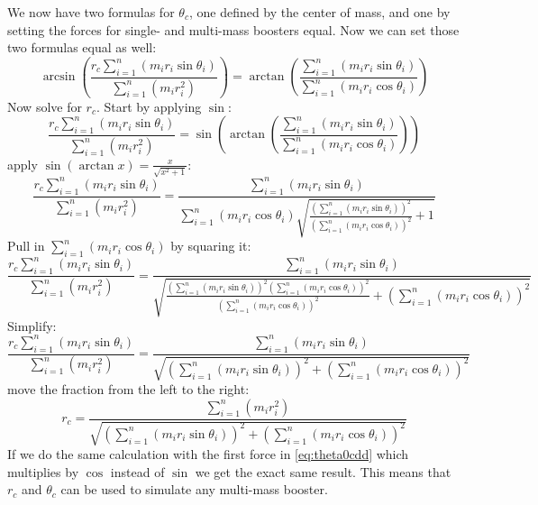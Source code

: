 \documentclass[titlepage]{article}
\numberwithin{equation}{section}
\begin{document}
We now have two formulas for $\theta_c$, one defined by the center of mass, and one by setting the forces for single- and multi-mass boosters equal.
Now we can set those two formulas equal as well:
\begin{equation}
\arcsin{\left(
    \frac{
        r_c \sum_{i=1}^{n}(m_i r_i \sin \theta_i)
    } {
        \sum_{i=1}^{n}(m_i r_i^2)
    }
\right)}
= \arctan{\left(\frac{
    \sum_{i=1}^{n}(m_i r_i \sin \theta_i)
} {
    \sum_{i=1}^{n}(m_i r_i \cos \theta_i)
}\right)}
\end{equation}
Now solve for $r_c$. Start by applying $\sin$:
\begin{equation}
\frac{
    r_c \sum_{i=1}^{n}(m_i r_i \sin \theta_i)
} {
    \sum_{i=1}^{n}(m_i r_i^2)
}
= \sin{\left( \arctan{\left( \frac{
    \sum_{i=1}^{n}(m_i r_i \sin \theta_i)
} {
    \sum_{i=1}^{n}(m_i r_i \cos \theta_i)
}\right)} \right)}
\end{equation}
apply $\sin {\left( \arctan x \right)} = \frac{x}{\sqrt{x^2 + 1}}$:
\begin{equation}
\frac{
    r_c \sum_{i=1}^{n}(m_i r_i \sin \theta_i)
} {
    \sum_{i=1}^{n}(m_i r_i^2)
}
= \frac{
    \sum_{i=1}^{n}(m_i r_i \sin \theta_i)
} {
    \sum_{i=1}^{n}(m_i r_i \cos \theta_i)
    \sqrt{\frac{
        \left(\sum_{i=1}^{n}(m_i r_i \sin \theta_i)\right)^2
    } {
        \left(\sum_{i=1}^{n}(m_i r_i \cos \theta_i)\right)^2
    } + 1 }
}
\end{equation}
Pull in $\sum_{i=1}^{n}(m_i r_i \cos \theta_i)$ by squaring it:
\begin{equation}
\frac{
    r_c \sum_{i=1}^{n}(m_i r_i \sin \theta_i)
} {
    \sum_{i=1}^{n}(m_i r_i^2)
}
= \frac{
    \sum_{i=1}^{n}(m_i r_i \sin \theta_i)
} {
    \sqrt{\frac{
        \left(\sum_{i=1}^{n}(m_i r_i \sin \theta_i)\right)^2 \left(\sum_{i=1}^{n}(m_i r_i \cos \theta_i)\right)^2
    } {
        \left(\sum_{i=1}^{n}(m_i r_i \cos \theta_i)\right)^2
    } + \left(\sum_{i=1}^{n}(m_i r_i \cos \theta_i)\right)^2 }
}
\end{equation}
Simplify:
\begin{equation}
\frac{
    r_c \sum_{i=1}^{n}(m_i r_i \sin \theta_i)
} {
    \sum_{i=1}^{n}(m_i r_i^2)
}
= \frac{
    \sum_{i=1}^{n}(m_i r_i \sin \theta_i)
} {
    \sqrt{
        \left(\sum_{i=1}^{n}(m_i r_i \sin \theta_i)\right)^2
      + \left(\sum_{i=1}^{n}(m_i r_i \cos \theta_i)\right)^2
    }
}
\end{equation}
move the fraction from the left to the right:
\begin{equation}
r_c = \frac{
    \sum_{i=1}^{n}(m_i r_i^2)
} {
    \sqrt{
        \left(\sum_{i=1}^{n}(m_i r_i \sin \theta_i)\right)^2
      + \left(\sum_{i=1}^{n}(m_i r_i \cos \theta_i)\right)^2
    }
}
\end{equation}
If we do the same calculation with the first force in \ref{eq:theta0cdd} which multiplies by $\cos$ instead of $\sin$ we get the exact same result. This means that $r_c$ and $\theta_c$ can be used to simulate any multi-mass booster.
\end{document}
